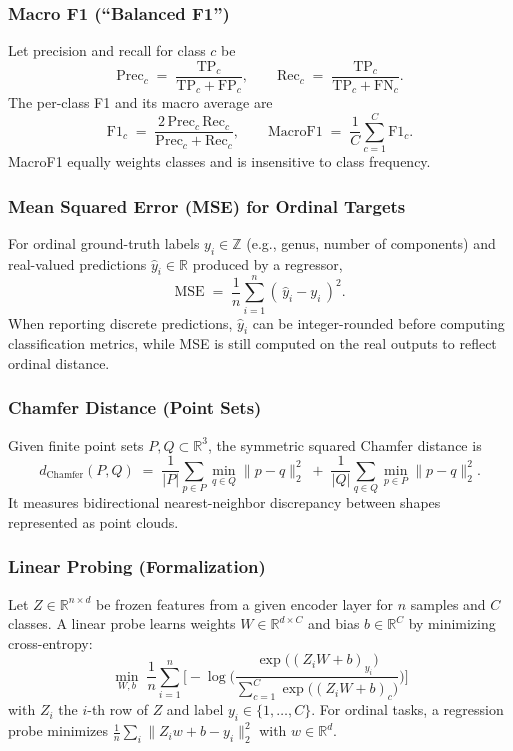 \subsubsection{Macro F1 (``Balanced F1'')}
Let precision and recall for class $c$ be
\begin{equation}
\mathrm{Prec}_c \;=\; \frac{\mathrm{TP}_c}{\mathrm{TP}_c+\mathrm{FP}_c},
\qquad
\mathrm{Rec}_c \;=\; \frac{\mathrm{TP}_c}{\mathrm{TP}_c+\mathrm{FN}_c}.
\end{equation}
The per-class F1 and its macro average are
\begin{equation}
\mathrm{F1}_c \;=\; \frac{2\,\mathrm{Prec}_c\,\mathrm{Rec}_c}{\mathrm{Prec}_c+\mathrm{Rec}_c},
\qquad
\mathrm{MacroF1} \;=\; \frac{1}{C}\sum_{c=1}^{C} \mathrm{F1}_c.
\end{equation}
MacroF1 equally weights classes and is insensitive to class frequency.

\subsubsection{Mean Squared Error (MSE) for Ordinal Targets}
For ordinal ground-truth labels $y_i \in \mathbb{Z}$ (e.g., genus, number of components) and real-valued predictions $\hat{y}_i \in \mathbb{R}$ produced by a regressor,
\begin{equation}
\mathrm{MSE} \;=\; \frac{1}{n}\sum_{i=1}^{n} (\,\hat{y}_i - y_i\,)^2.
\end{equation}
When reporting discrete predictions, $\hat{y}_i$ can be integer-rounded before computing classification metrics, while MSE is still computed on the real outputs to reflect ordinal distance.

\subsubsection{Chamfer Distance (Point Sets)}
Given finite point sets $P,Q \subset \mathbb{R}^3$, the symmetric squared Chamfer distance is
\begin{equation}
d_{\mathrm{Chamfer}}(P,Q) \;=\; \frac{1}{|P|}\sum_{p\in P}\min_{q\in Q}\|p-q\|_2^2 \;+\; \frac{1}{|Q|}\sum_{q\in Q}\min_{p\in P}\|p-q\|_2^2.
\end{equation}
It measures bidirectional nearest-neighbor discrepancy between shapes represented as point clouds.

\subsubsection{Linear Probing (Formalization)}
Let $Z \in \mathbb{R}^{n\times d}$ be frozen features from a given encoder layer for $n$ samples and $C$ classes.
A linear probe learns weights $W \in \mathbb{R}^{d\times C}$ and bias $b \in \mathbb{R}^C$ by minimizing cross-entropy:
\begin{equation}
\min_{W,b}\; \frac{1}{n}\sum_{i=1}^{n} \Big[ -\log \Big( \frac{\exp\big((Z_i W + b)_{y_i}\big)}{\sum_{c=1}^C \exp\big((Z_i W + b)_c\big)} \Big) \Big]
\end{equation}
with $Z_i$ the $i$-th row of $Z$ and label $y_i \in \{1,\dots,C\}$. For ordinal tasks, a regression probe minimizes $\frac{1}{n}\sum_i \|Z_i w + b - y_i\|_2^2$ with $w \in \mathbb{R}^d$.

